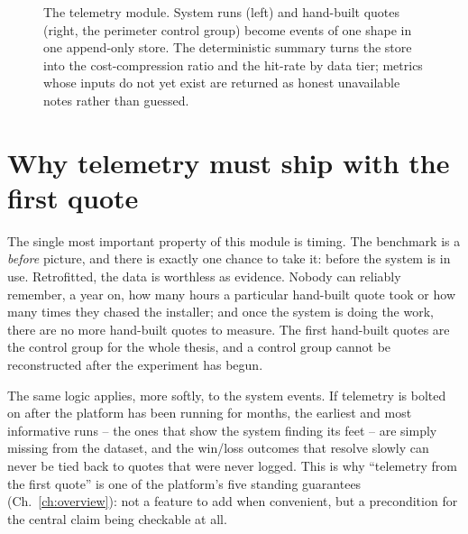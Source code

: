 \begin{figure}[H]
{}
\caption{The telemetry module. System runs (left) and hand-built quotes (right, the perimeter control group) become events of one shape in one append-only store. The deterministic summary turns the store into the cost-compression ratio and the hit-rate by data tier; metrics whose inputs do not yet exist are returned as honest unavailable notes rather than guessed.}
\label{fig:telemetry}
\end{figure}

\section{Why telemetry must ship with the first quote}

The single most important property of this module is timing. The benchmark is a \emph{before} picture, and there is exactly one chance to take it: before the system is in use. Retrofitted, the data is worthless as evidence. Nobody can reliably remember, a year on, how many hours a particular hand-built quote took or how many times they chased the installer; and once the system is doing the work, there are no more hand-built quotes to measure. The first hand-built quotes are the control group for the whole thesis, and a control group cannot be reconstructed after the experiment has begun.

The same logic applies, more softly, to the system events. If telemetry is bolted on after the platform has been running for months, the earliest and most informative runs -- the ones that show the system finding its feet -- are simply missing from the dataset, and the win/loss outcomes that resolve slowly can never be tied back to quotes that were never logged. This is why ``telemetry from the first quote'' is one of the platform's five standing guarantees (Ch.~\ref{ch:overview}): not a feature to add when convenient, but a precondition for the central claim being checkable at all.

